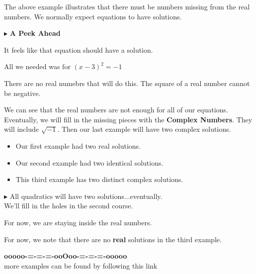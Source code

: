 \documentclass{ximera}
\begin{document}
The above example illustrates that there must be numbers missing from the real numbers.  We normally expect equations to have solutions. 


$\blacktriangleright$  \textbf{\textcolor{purple!85!blue}{A Peek Ahead}} 



It feels like that equation should have a solution.  


All we needed was for $(x-3)^2 = -1$ 

There are no real numebrs that will do this.  The square of a real number cannot be negative. 




We can see that the real numbers are not enough for all of our equations.  Eventually, we will fill in the missing pieces with the \textbf{Complex Numbers}.  They will include $\sqrt{-1}$.  Then our last example will have two complex solutions.  


\begin{itemize}
\item Our first example had two real solutions.  
\item Our second example had two identical solutions.  
\item This third example has two distinct complex solutions. 
\end{itemize}



$\blacktriangleright$ All quadratics will have two solutions...eventually. \\

We'll fill in the holes in the second course.









For now, we are staying inside the real numbers.



For now, we note that there are no \textbf{real} solutions in the third example.

























\begin{center}
\textbf{\textcolor{green!50!black}{ooooo-=-=-=-ooOoo-=-=-=-ooooo}} \\

more examples can be found by following this link\\ 

\end{center}
\end{document}
